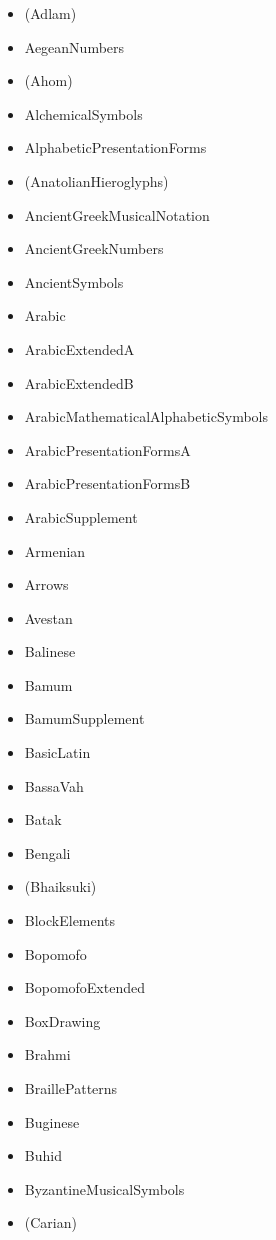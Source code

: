 \documentclass{article}
\newenvironment{itemlist}{%
  \begin{itemize}
  \setlength{\itemsep}{0pt}
  \setlength{\parsep}{0pt}
  \setlength{\topsep}{0pt}
  \setlength{\partopsep}{0pt}
  \setlength{\parskip}{0pt}
  \setlength{\labelsep}{5pt}}%
{
  \end{itemize}}
\begin{document}
    \begin{multicols*}{2}
      \begin{itemlist}
        \item (Adlam)
        \item AegeanNumbers
        \item (Ahom)
        \item AlchemicalSymbols
        \item AlphabeticPresentationForms
        \item (AnatolianHieroglyphs)
        \item AncientGreekMusicalNotation
        \item AncientGreekNumbers
        \item AncientSymbols
        \item Arabic
        \item ArabicExtendedA
        \item ArabicExtendedB
        \item ArabicMathematicalAlphabeticSymbols
        \item ArabicPresentationFormsA
        \item ArabicPresentationFormsB
        \item ArabicSupplement
        \item Armenian
        \item Arrows
        \item Avestan
        \item Balinese
        \item Bamum
        \item BamumSupplement
        \item BasicLatin
        \item BassaVah
        \item Batak
        \item Bengali
        \item (Bhaiksuki)
        \item BlockElements
        \item Bopomofo
        \item BopomofoExtended
        \item BoxDrawing
        \item Brahmi
        \item BraillePatterns
        \item Buginese
        \item Buhid
        \item ByzantineMusicalSymbols
        \item (Carian)

\end{itemlist}
\end{multicols*}
\end{document}
